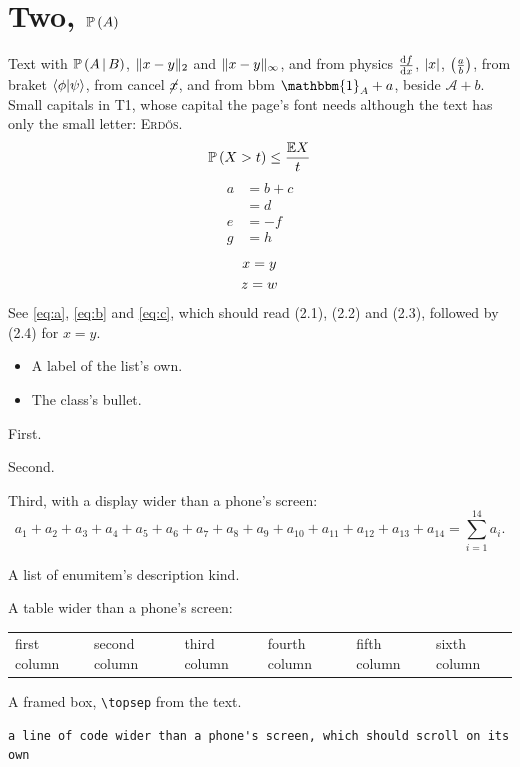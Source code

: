 \documentclass{article}
\numberwithin{equation}{section}
\newcommand{\cond}[2]{#1 \,\middle|\, #2}
\begin{document}
\section{Two, \texorpdfstring{$\mathbb{P}\left(A\right)$}{P(A)}}
Text with $\prob{\cond{A}{B}}$, $\dist{x}{y}$ and $\dist[\infty]{x}{y}$, and
from physics $\dv{f}{x}$, $\abs{x}$, $\qty(\frac{a}{b})$, from braket
$\braket{\phi|\psi}$, from cancel $\cancel{x}$, and from bbm
$\mathbbm{1}_A + a$, beside $\mathcal{A} + b$.
Small capitals in T1, whose capital the page's font needs although the text
has only the small letter: {\selectfont\textsc{Erdős}}.
\begin{equation}\label{eq:a}
    \mathbb{P}\left(X > t\right) \le \frac{\mathbb{E}X}{t}
\end{equation}
\begin{align}
    a &= b + c \label{eq:b}\\
      &= d \nonumber\\
    e &= -f \label{eq:c}\\
    g &= h \tag{$*$}
\end{align}
\begin{gather}
    x = y \\
    z = w \notag
\end{gather}
See \eqref{eq:a}, \eqref{eq:b} and \eqref{eq:c}, which should read (2.1),
(2.2) and (2.3), followed by (2.4) for $x = y$.
\begin{itemize}[label=Note:]
    \item A label of the list's own.
\end{itemize}
\begin{itemize}
    \item The class's bullet.
\end{itemize}
\begin{steps}
    \item First.
    \item Second.
    \item Third, with a display wider than a phone's screen:
    \[ a_1 + a_2 + a_3 + a_4 + a_5 + a_6 + a_7 + a_8 + a_9 + a_{10} + a_{11} + a_{12} + a_{13} + a_{14} = \sum_{i=1}^{14} a_i. \]
\end{steps}
\begin{terms}
    \item[Term] A list of enumitem's description kind.
\end{terms}
A table wider than a phone's screen:
\begin{center}
\begin{tabular}{llllll}
    first column & second column & third column & fourth column & fifth column & sixth column
\end{tabular}
\end{center}
\begin{framed}
    A framed box, \verb|\topsep| from the text.
\end{framed}
\begin{verbatim}
a line of code wider than a phone's screen, which should scroll on its own
\end{verbatim}
\end{document}
